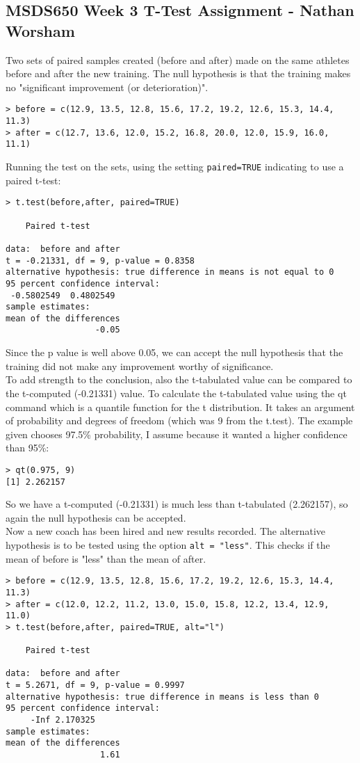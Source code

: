 \documentclass[10pt]{article}
\begin{document}
\subsection*{MSDS650 Week 3 T-Test Assignment - Nathan Worsham}
Two sets of paired samples created (before and after) made on the same athletes before and after the new training. The null hypothesis is that the training makes no "significant improvement (or deterioration)".
\begin{verbatim}
> before = c(12.9, 13.5, 12.8, 15.6, 17.2, 19.2, 12.6, 15.3, 14.4, 11.3)
> after = c(12.7, 13.6, 12.0, 15.2, 16.8, 20.0, 12.0, 15.9, 16.0, 11.1)
\end{verbatim}
Running the test on the sets, using the setting \verb|paired=TRUE| indicating to use a paired t-test:
\begin{verbatim}
> t.test(before,after, paired=TRUE)

	Paired t-test

data:  before and after
t = -0.21331, df = 9, p-value = 0.8358
alternative hypothesis: true difference in means is not equal to 0
95 percent confidence interval:
 -0.5802549  0.4802549
sample estimates:
mean of the differences 
                  -0.05 
\end{verbatim}
Since the p value is well above 0.05, we can accept the null hypothesis that the training did not make any improvement worthy of significance. \\
To add strength to the conclusion, also the t-tabulated value can be compared to the t-computed (-0.21331) value. To calculate the t-tabulated value using the qt command which is a quantile function for the t distribution. It takes an argument of probability and degrees of freedom (which was 9 from the t.test). The example given chooses 97.5\% probability, I assume because it wanted a higher confidence than 95\%:
\begin{verbatim}
> qt(0.975, 9)
[1] 2.262157
\end{verbatim}
So we have a t-computed (-0.21331) is much less than t-tabulated (2.262157), so again the null hypothesis can be accepted.\\
Now a new coach has been hired and new results recorded. The alternative hypothesis is to be tested using the option \verb|alt = "less"|. This checks if the mean of before is "less" than the mean of after.
\begin{verbatim}
> before = c(12.9, 13.5, 12.8, 15.6, 17.2, 19.2, 12.6, 15.3, 14.4, 11.3)
> after = c(12.0, 12.2, 11.2, 13.0, 15.0, 15.8, 12.2, 13.4, 12.9, 11.0)
> t.test(before,after, paired=TRUE, alt="l")

	Paired t-test

data:  before and after
t = 5.2671, df = 9, p-value = 0.9997
alternative hypothesis: true difference in means is less than 0
95 percent confidence interval:
     -Inf 2.170325
sample estimates:
mean of the differences 
                   1.61
\end{verbatim}
\end{document}
